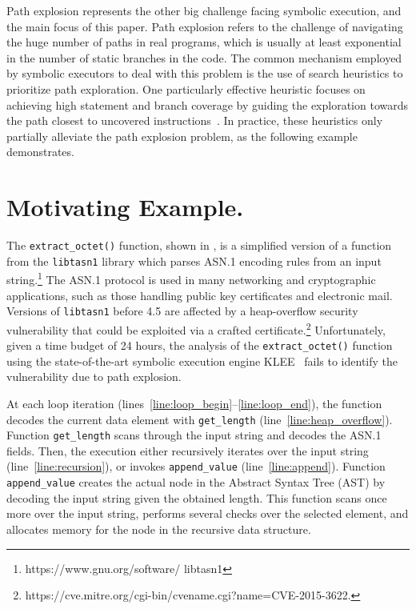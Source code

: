 Path explosion represents the other big challenge facing symbolic
execution, and the main focus of this paper.  Path explosion refers to
the challenge of navigating the huge number of paths in real programs,
which is usually at least exponential in the number of static branches
in the code. The common mechanism employed by symbolic executors to
deal with this problem is the use of search heuristics to prioritize
path exploration. One particularly effective heuristic focuses on
achieving high statement and branch coverage by guiding the
exploration towards the path closest to uncovered
instructions~\cite{exe,klee,sen:concolicheuristics,fitsymex:dsn09}.
In practice, these heuristics only partially alleviate the path
explosion problem, as the following example demonstrates.

\section{Motivating Example.}
The \texttt{extract\_octet()} function, shown in
, is a simplified version of a function from
the \texttt{libtasn1} library which parses ASN.1 encoding
rules from an input string.\footnote{https://www.gnu.org/software/
  libtasn1} The ASN.1 protocol is used in many networking and
cryptographic applications, such as those handling public key
certificates and electronic mail.  Versions of \texttt{libtasn1} before
4.5 are affected by a heap-overflow security vulnerability that could
be exploited via a crafted
certificate.\footnote{https://cve.mitre.org/cgi-bin/cvename.cgi?name=CVE-2015-3622.}
Unfortunately, given a time budget of 24 hours, the analysis of the
\texttt{extract\_octet()} function using the state-of-the-art symbolic
execution engine KLEE~\cite{klee} fails to identify the vulnerability
due to path explosion.

At each loop iteration
(lines~\ref{line:loop_begin}--\ref{line:loop_end}), the function
decodes the current data element with \texttt{get\_length}
(line~\ref{line:heap_overflow}). Function \texttt{get\_length} scans
through the input string and decodes the ASN.1 fields. Then, the
execution either recursively iterates over the input string
(line~\ref{line:recursion}), or invokes \texttt{append\_value}
(line~\ref{line:append}). Function \texttt{append\_value} creates the
actual node in the Abstract Syntax Tree (AST) by decoding the input
string given the obtained length. This function scans once more over
the input string, performs several checks over the selected element,
and allocates memory for the node in the recursive data structure.

